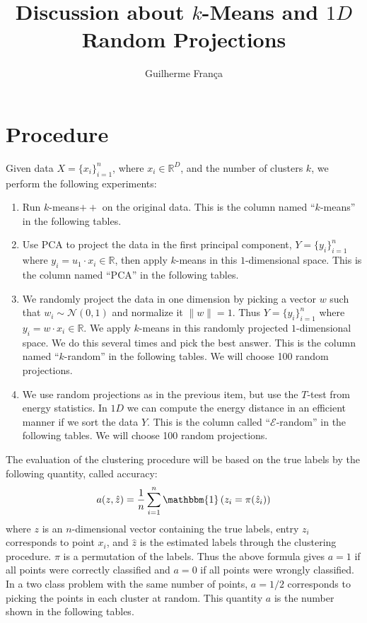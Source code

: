 \documentclass[aps,preprint,nofootinbib,floatfix]{revtex4-1}
\begin{document}
\title{Discussion about $k$-Means and $1D$ Random Projections}

\author{Guilherme Fran\c ca}

\maketitle

\section{Procedure}

Given data $X=\{ x_i \}_{i=1}^{n}$, where $x_i \in \mathbb{R}^{D}$, 
and the number of clusters $k$, we perform the following experiments:
\begin{enumerate}
\item Run $k$-means$++$ 
on the original data. This is the column named 
``$k$-means'' in the following tables.
\item Use PCA to 
project the data in the first principal component, 
$Y=\{ y_i \}_{i=1}^n$ where $y_i = u_{1}\cdot x_i \in \mathbb{R}$, then
apply $k$-means in this $1$-dimensional space. This is the column named
``PCA'' in the following tables.
\item We randomly project the data in one dimension by picking a vector
$w$ such that $w_i \sim \mathcal{N}(0,1)$ and normalize it $\| w \|=1$.
Thus $Y = \{y_i\}_{i=1}^n $ where $y_i = w\cdot x_i \in \mathbb{R}$. 
We apply $k$-means in this randomly projected
$1$-dimensional space. We do this several times and pick the best answer.
This is the column named ``$k$-random'' in the following tables.
We will choose 100 random projections.
\item We use random projections as in the previous item, but use the $T$-test
from energy statistics. In $1D$ we can compute the energy distance in an
efficient manner if we sort the data $Y$. This is the column called
``$\mathcal{E}$-random'' in the following tables.
We will choose 100 random projections.
\end{enumerate}

The evaluation of the clustering procedure 
will be based on the true labels by the following quantity, called
accuracy:
\begin{equation}
\label{eq:accuracy}
a(z,\hat{z}) = 
\dfrac{1}{n}\sum_{i=1}^{n} \mathbbm{1}\left(z_i = \pi(\hat{z}_i) \right)
\end{equation}
where $z$ is an $n$-dimensional vector containing the true labels, entry
$z_i$ corresponds to point $x_i$, and $\hat{z}$ is the estimated labels
through the clustering procedure. $\pi$ is a permutation of the labels.
Thus the above formula gives $a=1$ if all points were correctly classified and
$a=0$ if all points were wrongly classified. In a two class problem with
the same number of points, $a=1/2$ corresponds to picking the points in each
cluster at random. 
This quantity $a$ is the number shown in the following tables.
\end{document}
